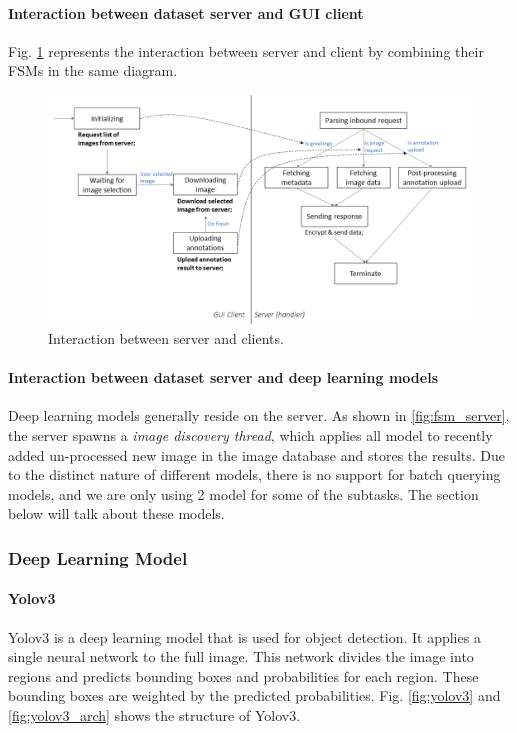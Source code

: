 \paragraph{Interaction between dataset server and GUI client} Fig. \ref{fig:interaction} represents the interaction between server and client by combining their FSMs in the same diagram. 

\begin{figure}
    \centering
    \includegraphics[width=\textwidth]{figures/interaction.png}
    \caption{Interaction between server and clients.}
    \label{fig:interaction}
\end{figure}

\paragraph{Interaction between dataset server and deep learning models} Deep learning models generally reside on the server. As shown in \ref{fig:fsm_server}, the server spawns a \textit{image discovery thread}, which applies all model to recently added un-processed new image in the image database and stores the results. Due to the distinct nature of different models, there is no support for batch querying models, and we are only using 2 model for some of the subtasks. The section below will talk about these models.

\subsubsection{Deep Learning Model}

\paragraph{Yolov3} Yolov3 is a deep learning model that is used for object detection. It applies a single neural network to the full image. This network divides the image into regions and predicts bounding boxes and probabilities for each region. These bounding boxes are weighted by the predicted probabilities. Fig. \ref{fig:yolov3} and \ref{fig:yolov3_arch} shows the structure of Yolov3.

